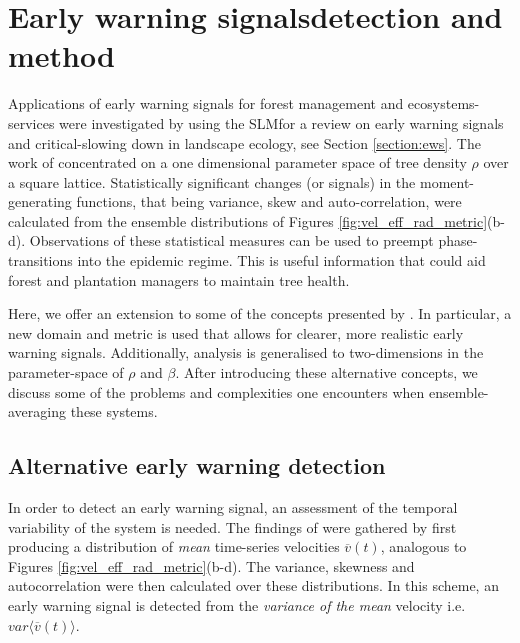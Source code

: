 \section{Early warning signals\textemdash detection and method}

Applications of early warning signals for forest management and ecosystems-services were %
investigated by \cite{OROZCOFUENTES201912} using the SLM\textemdash for a review on early %
warning signals and critical-slowing down in landscape ecology, see Section \ref{section:ews}. %
The work of \cite{OROZCOFUENTES201912} concentrated on a one dimensional parameter space of %
tree density $\rho$ over a square lattice. %
Statistically significant changes (or signals) in the moment-generating functions, %
that being variance, skew and auto-correlation, were calculated from the ensemble distributions of Figures \ref{fig:vel_eff_rad_metric}(b-d). %
Observations of these statistical measures can be used to preempt phase-transitions into the epidemic regime. %
This is useful information that could aid forest and plantation managers to maintain tree health. %

Here, we offer an extension to some of the concepts presented by \cite{OROZCOFUENTES201912}. %
In particular, a new domain and metric is used that allows for clearer, more realistic early warning signals.  %
Additionally, analysis is generalised to two-dimensions in the parameter-space of $\rho$ and $\beta$. %
After introducing these alternative concepts, we discuss some of the problems and complexities one encounters %
when ensemble-averaging these systems. %

\subsection{Alternative early warning detection}

In order to detect an early warning signal, an assessment of  the temporal variability of the system is needed. %
The findings of \cite{OROZCOFUENTES201912} were gathered by first producing a distribution of \textit{mean} time-series velocities $\overline{v}(t)$, %
analogous to Figures \ref{fig:vel_eff_rad_metric}(b-d). %
The variance, skewness and autocorrelation were then calculated over these distributions. %
In this scheme, an early warning signal is detected from the \textit{variance of the mean} velocity i.e. $var\big\langle \overline{v}(t) \big\rangle $. %


